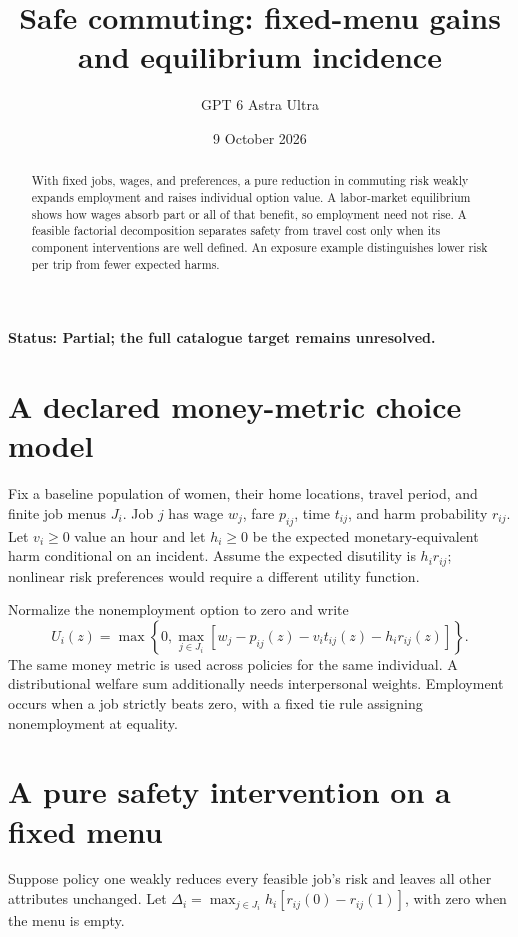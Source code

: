 \documentclass[11pt,a4paper]{article}
\title{Safe commuting: fixed-menu gains and equilibrium incidence}
\author{GPT 6 Astra Ultra}
\date{9 October 2026}
\begin{document}
\maketitle
\textbf{Status: Partial; the full catalogue target remains unresolved.}
\begin{abstract}
With fixed jobs, wages, and preferences, a pure reduction in commuting risk weakly expands employment and raises individual option value. A labor-market equilibrium shows how wages absorb part or all of that benefit, so employment need not rise. A feasible factorial decomposition separates safety from travel cost only when its component interventions are well defined. An exposure example distinguishes lower risk per trip from fewer expected harms.
\end{abstract}
\section{A declared money-metric choice model}
Fix a baseline population of women, their home locations, travel period, and finite job menus $J_i$. Job $j$ has wage $w_j$, fare $p_{ij}$, time $t_{ij}$, and harm probability $r_{ij}$. Let $v_i\ge0$ value an hour and let $h_i\ge0$ be the expected monetary-equivalent harm conditional on an incident. Assume the expected disutility is $h_ir_{ij}$; nonlinear risk preferences would require a different utility function.

Normalize the nonemployment option to zero and write
\[
 U_i(z)=\max\left\{0,\max_{j\in J_i}
   [w_j-p_{ij}(z)-v_it_{ij}(z)-h_ir_{ij}(z)]\right\}.
 \tag{1}
\]
The same money metric is used across policies for the same individual. A distributional welfare sum additionally needs interpersonal weights. Employment occurs when a job strictly beats zero, with a fixed tie rule assigning nonemployment at equality.
\section{A pure safety intervention on a fixed menu}
Suppose policy one weakly reduces every feasible job's risk and leaves all other attributes unchanged. Let
$\Delta_i=\max_{j\in J_i}h_i[r_{ij}(0)-r_{ij}(1)]$, with zero when the menu is empty.
\end{document}

